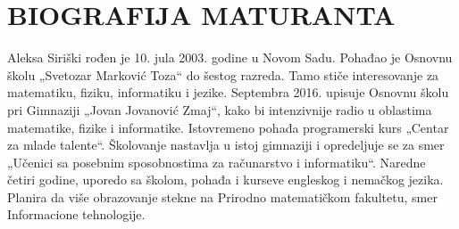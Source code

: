 \documentclass[a4paper,14pt]{article}
\begin{document}
\section{BIOGRAFIJA MATURANTA}
Aleksa Siriški rođen je 10. jula 2003. godine u Novom Sadu. Pohađao je Osnovnu školu „Svetozar Marković Toza“ do šestog razreda. Tamo stiče interesovanje za matematiku, fiziku, informatiku i jezike. Septembra 2016. upisuje Osnovnu školu pri Gimnaziji „Jovan Jovanović Zmaj“, kako bi intenzivnije radio u oblastima matematike, fizike i informatike. Istovremeno pohađa programerski kurs „Centar za mlade talente“. Školovanje nastavlja u istoj gimnaziji i opredeljuje se za smer „Učenici sa posebnim sposobnostima za računarstvo i informatiku“. Naredne četiri godine, uporedo sa školom, pohađa i kurseve engleskog i nemačkog jezika. Planira da više obrazovanje stekne na Prirodno matematičkom fakultetu, smer Informacione tehnologije.
\newpage
\end{document}
